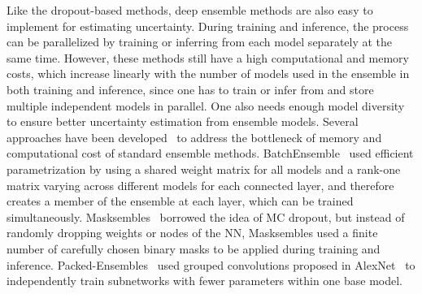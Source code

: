     Like the dropout-based methods, deep ensemble methods are also easy to implement for estimating uncertainty. During training and inference, the process can be parallelized by training or inferring from each model separately at the same time. However, these methods still have a high computational and memory costs, which increase linearly with the number of models used in the ensemble in both training and inference, since one has to train or infer from and store multiple independent models in parallel. One also needs enough model diversity to ensure better uncertainty estimation from ensemble models. Several approaches have been developed~\cite{BatchEnsemble, Masksembles, PackedEnsemble} to address the bottleneck of memory and computational cost of standard ensemble methods. BatchEnsemble~\cite{BatchEnsemble} used efficient parametrization by using a shared weight matrix for all models and a rank-one matrix varying across different models for each connected layer, and therefore creates a member of the ensemble at each layer, which can be trained simultaneously. Masksembles~\cite{Masksembles} borrowed the idea of MC dropout, but instead of randomly dropping weights or nodes of the NN, Masksembles used a finite number of carefully chosen binary masks to be applied during training and inference. Packed-Ensembles~\cite{PackedEnsemble} used grouped convolutions proposed in AlexNet~\cite{AlexNet} to independently train subnetworks with fewer parameters within one base model.



